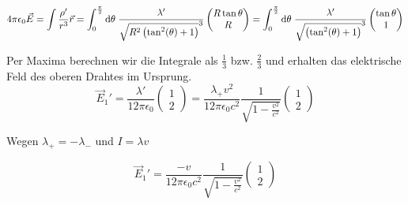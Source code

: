 \documentclass[a4paper,german,12pt,smallheadings]{scrartcl}
\begin{document}

\begin{equation}
  4 \pi \epsilon_0 \vec{E} =
  \int \frac{\rho'}{r^3} \vec{r} =
  \int_0^\frac{\pi}{2} \dif \theta \; \frac{\lambda'}{\sqrt{R^2 \del{\tan^2(\theta) +1}}^3}
  \begin{pmatrix}
    R \tan \theta \\
    R
  \end{pmatrix}
  =
  \int_0^\frac{\pi}{2} \dif \theta \; \frac{\lambda'}{\sqrt{\del{\tan^2(\theta) +1}}^3}
  \begin{pmatrix}
    \tan \theta \\
    1
  \end{pmatrix}
\end{equation}

Per Maxima berechnen wir die Integrale als $\frac{1}{3}$ bzw. $\frac{2}{3}$ und
erhalten das elektrische Feld des oberen Drahtes im Ursprung.
\begin{equation}
  \vec{E}_1' = \frac{\lambda'}{12\pi \epsilon_0} \begin{pmatrix} 1 \\ 2 \end{pmatrix}
  = \frac{\lambda_+ v^2}{12 \pi \epsilon_0 c^2} \frac{1}{\sqrt{1 - \frac{v^2}{c^2}}} \begin{pmatrix} 1 \\ 2 \end{pmatrix}
\end{equation}

Wegen $\lambda_+ = -\lambda_-$ und $I = \lambda v$

\begin{equation}
  \vec{E}_1'
  = \frac{-v}{12 \pi \epsilon_0 c^2} \frac{1}{\sqrt{1 - \frac{v^2}{c^2}}} \begin{pmatrix} 1 \\ 2 \end{pmatrix}
\end{equation}
\end{document}
